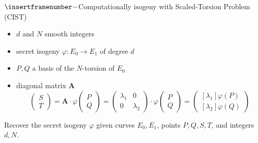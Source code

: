 \documentclass[10pt]{beamer}
\theoremstyle{plain}
\theoremstyle{example}
\begin{document}
\begin{frame}{$\insertframenumber -$Computationally isogeny with Scaled-Torsion Problem (CIST)}
	\begin{itemize}
		\item $d$ and $N$ smooth integers
		\item secret isogeny $\varphi:E_0\to E_1$ of degree $d$ 
		\item $P,Q$ a basis of the $N$-torsion of $E_0$
		\item diagonal matrix $\mathbf A$
			\[
			\begin{pmatrix} S \\ T \end{pmatrix} = \mathbf A \cdot\varphi
			\begin{pmatrix} P \\ Q \end{pmatrix} = 
			\begin{pmatrix} \lambda_1 & 0 \\ 0 & \lambda_2 \end{pmatrix} \cdot\varphi
			\begin{pmatrix} P \\ Q \end{pmatrix} 
			= \begin{pmatrix} [\lambda_1]\varphi(P) \\ [\lambda_2]\varphi(Q) \end{pmatrix} 
			\] 
	\end{itemize}
	\begin{problem}
		Recover the secret isogeny $\varphi$ given curves $E_0,E_1$, points $P,Q,S,T$, and
		integers $d,N$.
	\end{problem}
\end{frame}
%
%	
\end{document}
